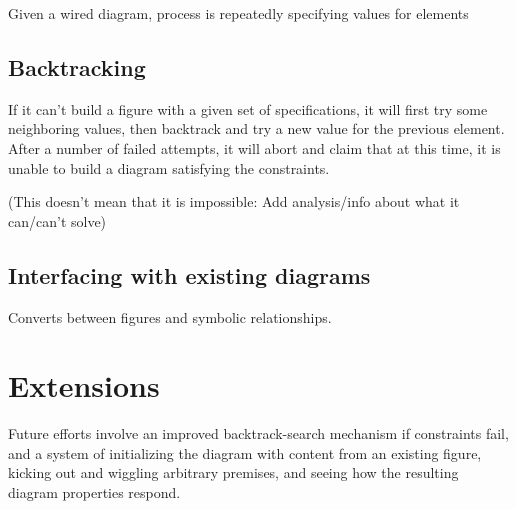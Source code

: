Given a wired diagram, process is repeatedly specifying values for elements

\subsection{Backtracking}

If it can't build a figure with a given set of specifications, it will
first try some neighboring values, then backtrack and try a new value
for the previous element. After a number of failed attempts, it will
abort and claim that at this time, it is unable to build a diagram
satisfying the constraints.

(This doesn't mean that it is impossible: Add analysis/info about what
it can/can't solve)

\subsection{Interfacing with existing diagrams}

Converts between figures and symbolic relationships.

\section{Extensions}

Future efforts involve an improved backtrack-search mechanism if
constraints fail, and a system of initializing the diagram with
content from an existing figure, kicking out and wiggling arbitrary
premises, and seeing how the resulting diagram properties respond.
